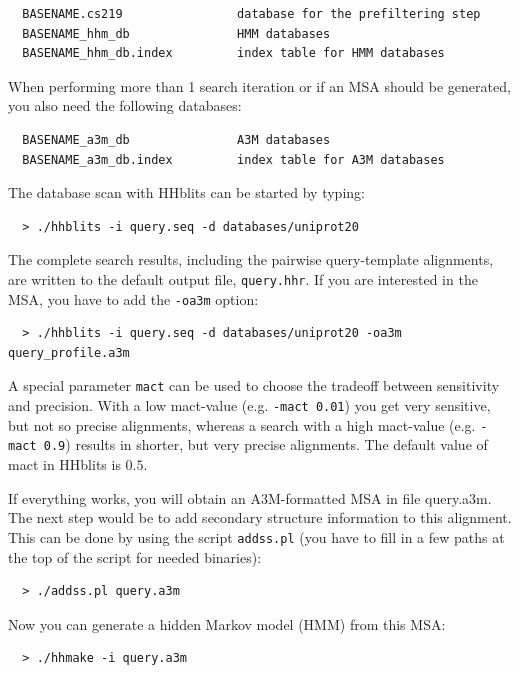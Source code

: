 \documentclass[11pt,a4paper]{article}
\begin{document}
\begin{verbatim}
  BASENAME.cs219                database for the prefiltering step
  BASENAME_hhm_db               HMM databases
  BASENAME_hhm_db.index         index table for HMM databases
\end{verbatim}

When performing more than 1 search iteration or if an MSA should be generated, you also need the 
following databases:

\begin{verbatim}
  BASENAME_a3m_db               A3M databases
  BASENAME_a3m_db.index         index table for A3M databases
\end{verbatim}

The database scan with HHblits can be started by typing:

\begin{verbatim}
  > ./hhblits -i query.seq -d databases/uniprot20
\end{verbatim}

The complete search results, including the pairwise query-template alignments, are written to 
the default output file, \verb`query.hhr`. If you are interested in the MSA, you have to add the 
\verb`-oa3m` option:

\begin{verbatim}
  > ./hhblits -i query.seq -d databases/uniprot20 -oa3m query_profile.a3m
\end{verbatim}

A special parameter \verb`mact` can be used to choose the tradeoff between sensitivity and 
precision. With a low mact-value (e.g. \verb`-mact 0.01`) you get very sensitive, but not 
so precise alignments, whereas a search with a high mact-value (e.g. \verb`-mact 0.9`) results 
in shorter, but very precise alignments. The default value of mact in HHblits is $0.5$. 

If everything works, you will obtain an A3M-formatted MSA in file query.a3m. The next step would 
be to add secondary structure information to this alignment. This can be done by using the script
\verb`addss.pl` (you have to fill in a few paths at the top of the script for needed binaries):

\begin{verbatim}
  > ./addss.pl query.a3m
\end{verbatim}

Now you can generate a hidden Markov model (HMM) from this MSA:
\begin{verbatim}
  > ./hhmake -i query.a3m
\end{verbatim}
\end{document}
